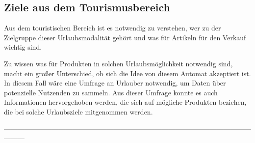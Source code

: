 \subsection{Ziele aus dem Tourismusbereich}


Aus dem touristischen Bereich ist es notwendig zu verstehen, wer zu der Zielgruppe dieser Urlaubsmodalität gehört
und was für Artikeln für den Verkauf wichtig sind.


Zu wissen was für Produkten in solchen Urlaubsmöglichkeit notwendig sind, macht ein großer Unterschied, ob sich die
Idee von diesem Automat akzeptiert ist. In diesem Fall wäre eine Umfrage an Urlauber notwendig, um Daten über 
potenzielle Nutzenden zu sammeln. Aus dieser Umfrage konnte es auch Informationen hervorgehoben werden, die sich auf
mögliche Produkten beziehen, die bei solche Urlaubsziele mitgenommen werden.

---------------------------------------------------------------------------------------------------------------------